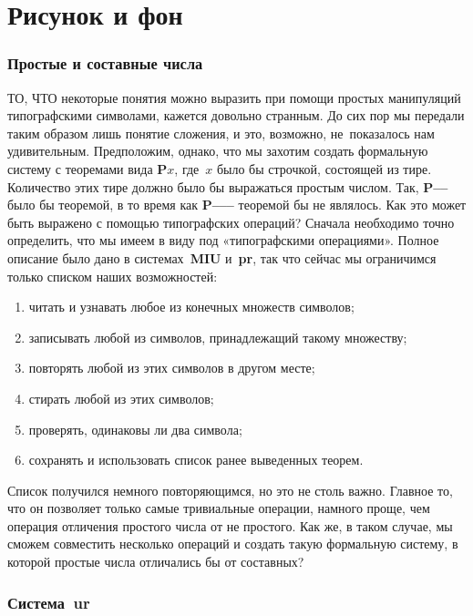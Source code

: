 \documentclass[../main.tex]{subfiles}
\begin{document}
\chapter{Рисунок и фон}

\subsection{Простые и составные числа}

ТО, ЧТО некоторые понятия можно выразить при помощи простых манипуляций типографскими символами, кажется довольно странным.
До сих пор мы передали таким образом лишь понятие сложения, и это, возможно, не~показалось нам удивительным.
Предположим, однако, что мы захотим создать формальную систему с теоремами вида \textbf{P$x$}, где~$x$ было бы строчкой, состоящей из тире.
Количество этих тире должно было бы выражаться простым числом.
Так, \textbf{P--{}--} было бы теоремой, в то время как \textbf{P--{}--{}--} теоремой бы не являлось.
Как это может быть выражено с помощью типографских операций?
Сначала необходимо точно определить, что мы имеем в виду под «типографскими операциями».
Полное описание было дано в системах~\textbf{MIU} и~\textbf{pr}, так что сейчас мы ограничимся только списком наших возможностей:

\begin{enumerate}[label=(\arabic*), noitemsep, topsep=6pt]
    \item читать и узнавать любое из конечных множеств символов;
    \item записывать любой из символов, принадлежащий такому множеству;
    \item повторять любой из этих символов в другом месте;
    \item стирать любой из этих символов;
    \item проверять, одинаковы ли два символа;
    \item сохранять и использовать список ранее выведенных теорем.
\end{enumerate}

Список получился немного повторяющимся, но это не столь важно.
Главное то, что он позволяет только самые тривиальные операции, намного проще, чем операция отличения простого числа от не простого.
Как же, в таком случае, мы сможем совместить несколько операций и создать такую формальную систему, в которой простые числа отличались бы от составных?

\subsection{Система~\textbf{ur}}
\end{document}
